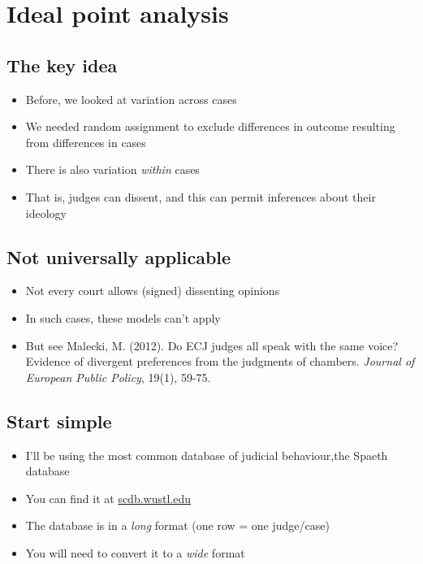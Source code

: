 \documentclass[12pt,twoside]{article}
\title{\myTitle}
\author{Chris Hanretty}
\date{6th May 2016}
\providecommand{\tightlist}{%
  \setlength{\itemsep}{0pt}\setlength{\parskip}{0pt}}
\begin{document}
\maketitle

\section{Ideal point analysis}\label{ideal-point-analysis}

\subsection{The key idea}\label{the-key-idea}

\begin{itemize}
\tightlist
\item
  Before, we looked at variation across cases
\item
  We needed random assignment to exclude differences in outcome
  resulting from differences in cases
\item
  There is also variation \emph{within} cases
\item
  That is, judges can dissent, and this can permit inferences about
  their ideology
\end{itemize}

\subsection{Not universally
applicable}\label{not-universally-applicable}

\begin{itemize}
\tightlist
\item
  Not every court allows (signed) dissenting opinions
\item
  In such cases, these models can't apply
\item
  But see Malecki, M. (2012). Do ECJ judges all speak with the same
  voice? Evidence of divergent preferences from the judgments of
  chambers. \emph{Journal of European Public Policy}, 19(1), 59-75.
\end{itemize}

\subsection{Start simple}\label{start-simple}

\begin{itemize}
\tightlist
\item
  I'll be using the most common database of judicial behaviour,the
  Spaeth database
\item
  You can find it at \url{scdb.wustl.edu}
\item
  The database is in a \emph{long} format (one row = one judge/case)
\item
  You will need to convert it to a \emph{wide} format
\end{itemize}
\end{document}
